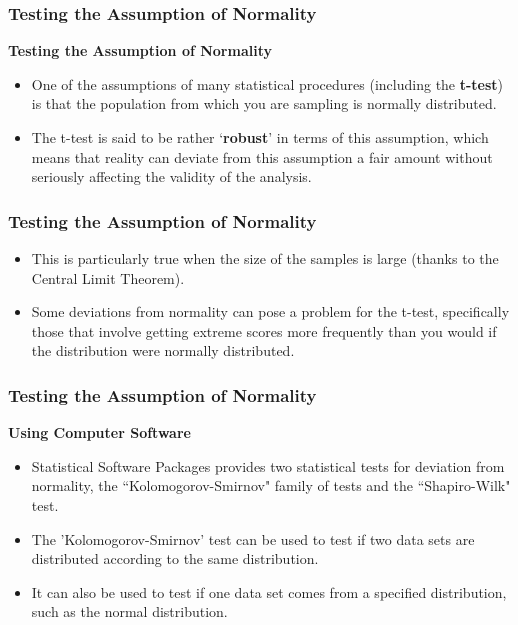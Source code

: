 \documentclass{beamer}
\begin{document}
	\begin{frame}
		\frametitle{Testing the Assumption of Normality}
		\Large
\textbf{	Testing the Assumption of Normality}
	
	\begin{itemize}
		\item	One of the assumptions of many statistical procedures (including the \textbf{t-test}) is that the population from which you are sampling is normally distributed. 
		\item	The t-test is said to be rather ‘\textbf{robust}’ in terms of this assumption, which means that reality can deviate from this assumption a fair amount without seriously affecting the validity of the analysis. 
		\end{itemize}
		
	\end{frame}
	
	
	\begin{frame}
		\frametitle{Testing the Assumption of Normality}
		\Large
		
		\begin{itemize}	
		
		\item This is particularly true when the size of the samples is large (thanks to the Central Limit Theorem). 
		\item Some deviations from normality can pose a problem for the t-test, specifically those that involve getting extreme scores more frequently than you would if the distribution were normally distributed.
	\end{itemize}

	\end{frame}
	
	
	\begin{frame}
		\frametitle{Testing the Assumption of Normality}
		\Large
		\noindent \textbf{Using Computer Software}
		\begin{itemize}
				\item	Statistical Software Packages provides two statistical tests for deviation from normality, the ``Kolomogorov-Smirnov" family of tests and the ``Shapiro-Wilk" test.
				\item	The 'Kolomogorov-Smirnov' test can be used to test if two data sets are distributed according to the same distribution. 
				\item	It can also be used to test if one data set comes from a specified distribution, such as the normal distribution. 
		\end{itemize}

	\end{frame}
	
\end{document}
